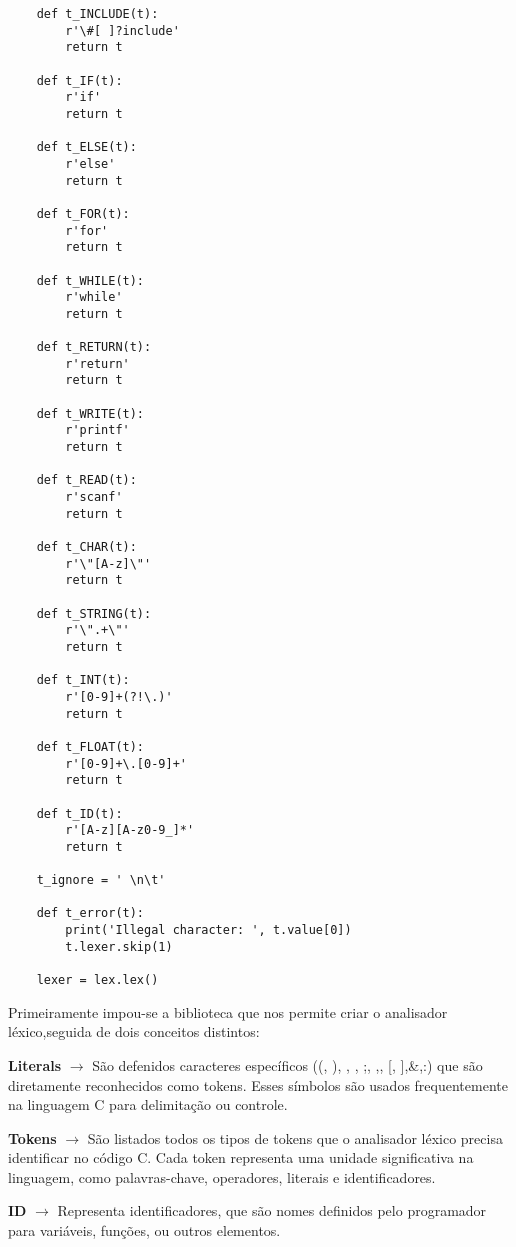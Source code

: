 \documentclass[12pt,a4paper]{report}
\begin{document}
\begin{lstlisting}
    def t_INCLUDE(t):
        r'\#[ ]?include'
        return t
        
    def t_IF(t):
        r'if'
        return t
        
    def t_ELSE(t):
        r'else'
        return t
        
    def t_FOR(t):
        r'for'
        return t
        
    def t_WHILE(t):
        r'while'
        return t
        
    def t_RETURN(t):
        r'return'
        return t
        
    def t_WRITE(t):
        r'printf'
        return t
        
    def t_READ(t):
        r'scanf'
        return t
        
    def t_CHAR(t):
        r'\"[A-z]\"'
        return t
        
    def t_STRING(t):
        r'\".+\"'
        return t
        
    def t_INT(t):
        r'[0-9]+(?!\.)'
        return t
        
    def t_FLOAT(t):
        r'[0-9]+\.[0-9]+'
        return t
        
    def t_ID(t):
        r'[A-z][A-z0-9_]*'
        return t
        
    t_ignore = ' \n\t'
        
    def t_error(t):
        print('Illegal character: ', t.value[0])
        t.lexer.skip(1)
    
    lexer = lex.lex()

\end{lstlisting}

    Primeiramente impou-se a biblioteca que nos permite criar o analisador léxico,seguida de dois conceitos distintos:
    
    \hspace{1cm}
    \textbf{Literals} $\rightarrow$ São defenidos caracteres específicos ((, ), {, }, ;, ,, [, ],\&,:) que são diretamente reconhecidos como tokens. Esses símbolos são usados frequentemente na linguagem C para delimitação ou controle.
    
    \hspace{1cm}
    \textbf{Tokens} $\rightarrow$ São listados todos os tipos de tokens que o analisador léxico precisa identificar no código C. Cada token representa uma unidade significativa na linguagem, como palavras-chave, operadores, literais e identificadores.

    \hspace{3cm}
    \textbf{ID} $\rightarrow$ Representa identificadores, que são nomes definidos pelo programador para variáveis, funções, ou outros elementos.
\end{document}
